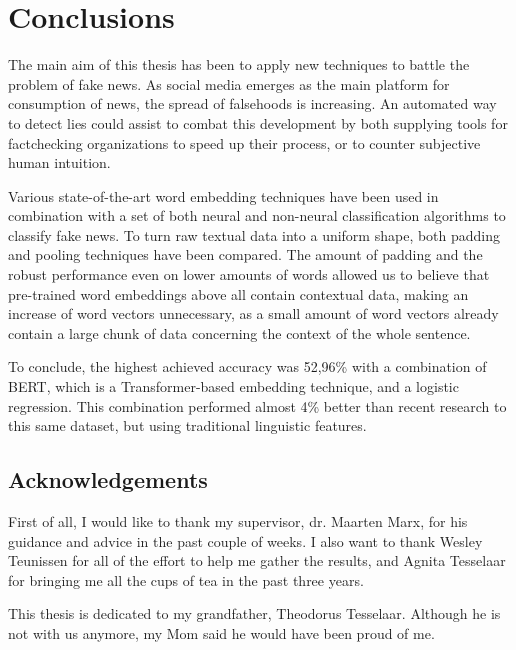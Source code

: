 \section{Conclusions}
The main aim of this thesis has been to apply new techniques to battle the problem of fake news.
As social media emerges as the main platform for consumption of news, the spread of falsehoods is increasing. 
An automated way to detect lies could assist to combat this development by both supplying tools for factchecking organizations to speed up their process, or to counter subjective human intuition.

Various state-of-the-art word embedding techniques have been used in combination with a set of both neural and non-neural classification algorithms to classify fake news.
To turn raw textual data into a uniform shape, both padding and pooling techniques have been compared. 
The amount of padding and the robust performance even on lower amounts of words allowed us to believe that pre-trained word embeddings above all contain contextual data, making an increase of word vectors unnecessary, as a small amount of word vectors already contain a large chunk of data concerning the context of the whole sentence. 

To conclude, the highest achieved accuracy was 52,96\% with a combination of BERT, which is a Transformer-based embedding technique, and a logistic regression.
This combination performed almost 4\% better than recent research to this same dataset, but using traditional linguistic features. 

\subsection{Acknowledgements}
First of all, I would like to thank my supervisor, dr. Maarten Marx, for his guidance and advice in the past couple of weeks. 
I also want to thank Wesley Teunissen for all of the effort to help me gather the results, and Agnita Tesselaar for bringing me all the cups of tea in the past three years.

This thesis is dedicated to my grandfather, Theodorus Tesselaar.
Although he is not with us anymore, my Mom said he would have been proud of me. 

\pagebreak